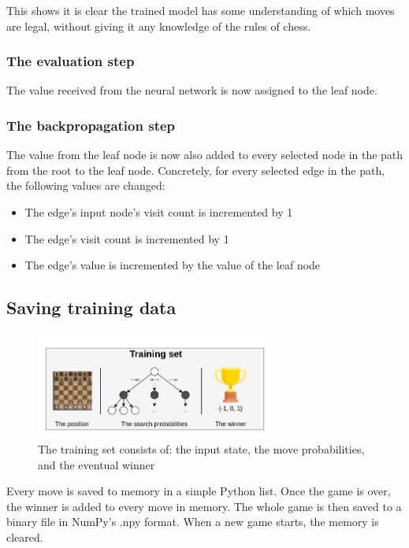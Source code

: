 \documentclass{article}
\begin{document}
This shows it is clear the trained model has some understanding of which moves are legal, 
without giving it any knowledge of the rules of chess. 

\subsubsection{The evaluation step}

The value received from the neural network is now assigned to the leaf node.

\subsubsection{The backpropagation step}

The value from the leaf node is now also added to every selected node in the path from the root to the leaf node.
Concretely, for every selected edge in the path, the following values are changed:

\begin{itemize}
    \item The edge's input node's visit count is incremented by 1
    \item The edge's visit count is incremented by 1
    \item The edge's value is incremented by the value of the leaf node
\end{itemize}


\subsection{Saving training data}


\begin{figure}[H]
    \centering
    \includegraphics[width=0.7\textwidth]{img/trainingset.png}
    \caption{The training set consists of: the input state, the move probabilities, and the eventual winner}
\end{figure}

Every move is saved to memory in a simple Python list. Once the game is over, the winner is added to every move in memory.
The whole game is then saved to a binary file in NumPy's .npy format. 
When a new game starts, the memory is cleared.
\end{document}
